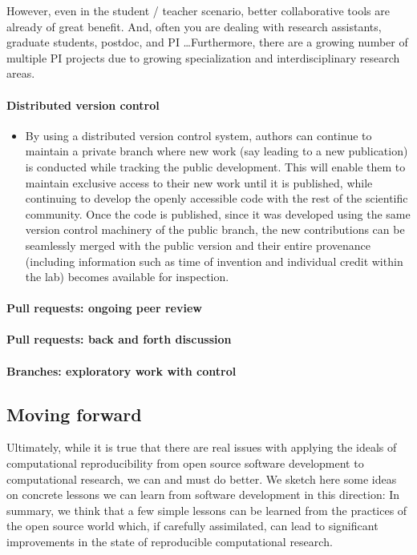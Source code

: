 \documentclass[ChapterTOCs,krantz2]{krantz} %
\begin{document}
However, even in the student / teacher scenario, better collaborative tools
are already of great benefit.  And, often you are dealing with research
assistants, graduate students, postdoc, and PI \ldots  Furthermore, there are a
growing number of multiple PI projects due to growing specialization and
interdisciplinary research areas.

\paragraph{ {\bf Distributed version control}}

\begin{itemize}
\item By using a distributed version control system, authors can continue
to maintain a private branch where new work (say leading to a new
publication) is conducted while tracking the public development. This
will enable them to maintain exclusive access to their new work until
it is published, while continuing to develop the openly accessible
code with the rest of the scientific community. Once the code is published,
since it was developed using the same version control machinery of
the public branch, the new contributions can be seamlessly merged
with the public version and their entire provenance (including information
such as time of invention and individual credit within the lab) becomes
available for inspection.
\end{itemize}

\paragraph{ {\bf Pull requests: ongoing peer review}}

\paragraph{ {\bf Pull requests: back and forth discussion}}

\paragraph{ {\bf Branches: exploratory work with control}}


\subsection{Moving forward }

Ultimately, while it is true that there are real issues with applying
the ideals of computational reproducibility from open source software
development to computational research, we can and must do better.
We sketch here some ideas on concrete lessons we can learn from software
development in this direction:
In summary, we think that a few simple lessons can be learned from
the practices of the open source world which, if carefully assimilated,
can lead to significant improvements in the state of reproducible
computational research. 
\end{document}
